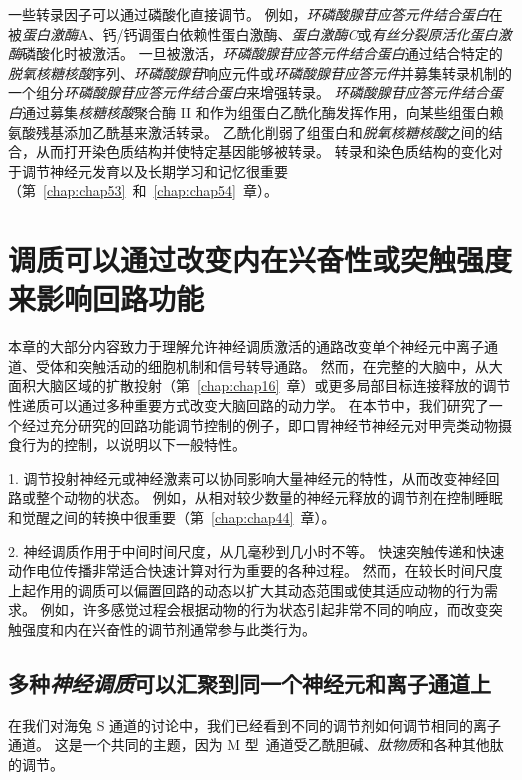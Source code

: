 一些转录因子可以通过磷酸化直接调节。
例如，\textit{环磷酸腺苷应答元件结合蛋白}在被\textit{蛋白激酶}A、钙/钙调蛋白依赖性蛋白激酶、\textit{蛋白激酶C}或\textit{有丝分裂原活化蛋白激酶}磷酸化时被激活。
一旦被激活，\textit{环磷酸腺苷应答元件结合蛋白}通过结合特定的\textit{脱氧核糖核酸}序列、\textit{环磷酸腺苷}响应元件或\textit{环磷酸腺苷应答元件}并募集转录机制的一个组分\textit{环磷酸腺苷应答元件结合蛋白}来增强转录。
\textit{环磷酸腺苷应答元件结合蛋白}通过募集\textit{核糖核酸}聚合酶 II 和作为组蛋白乙酰化酶发挥作用，向某些组蛋白赖氨酸残基添加乙酰基来激活转录。
乙酰化削弱了组蛋白和\textit{脱氧核糖核酸}之间的结合，从而打开染色质结构并使特定基因能够被转录。
转录和染色质结构的变化对于调节神经元发育以及长期学习和记忆很重要（第~\ref{chap:chap53}~和~\ref{chap:chap54}~章）。



\section{调质可以通过改变内在兴奋性或突触强度来影响回路功能}

本章的大部分内容致力于理解允许神经调质激活的通路改变单个神经元中离子通道、受体和突触活动的细胞机制和信号转导通路。
然而，在完整的大脑中，从大面积大脑区域的扩散投射（第~\ref{chap:chap16}~章）或更多局部目标连接释放的调节性递质可以通过多种重要方式改变大脑回路的动力学。
在本节中，我们研究了一个经过充分研究的回路功能调节控制的例子，即口胃神经节神经元对甲壳类动物摄食行为的控制，以说明以下一般特性。


1. 调节投射神经元或神经激素可以协同影响大量神经元的特性，从而改变神经回路或整个动物的状态。
例如，从相对较少数量的神经元释放的调节剂在控制睡眠和觉醒之间的转换中很重要（第~\ref{chap:chap44}~章）。


2. 神经调质作用于中间时间尺度，从几毫秒到几小时不等。
快速突触传递和快速动作电位传播非常适合快速计算对行为重要的各种过程。
然而，在较长时间尺度上起作用的调质可以偏置回路的动态以扩大其动态范围或使其适应动物的行为需求。
例如，许多感觉过程会根据动物的行为状态引起非常不同的响应，而改变突触强度和内在兴奋性的调节剂通常参与此类行为。



\subsection{多种\textit{神经调质}可以汇聚到同一个神经元和离子通道上}

在我们对海兔 S 通道的讨论中，我们已经看到不同的调节剂如何调节相同的离子通道。
这是一个共同的主题，因为 M 型~通道受乙酰胆碱、\textit{肽物质}和各种其他肽的调节。


